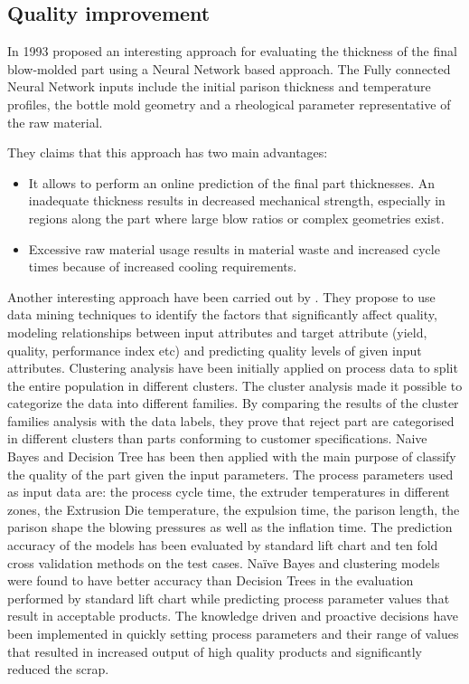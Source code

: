 \subsection{Quality improvement \label{Quality improvement}}

In 1993 \citep{diraddo1993line} proposed an interesting approach for evaluating the thickness of the final blow-molded part using a Neural Network based approach. The Fully connected Neural Network inputs include the initial parison thickness and temperature profiles, the bottle mold geometry and a rheological parameter representative of the raw material. 



They claims that this approach has two main advantages:

\begin{itemize}
    \item It allows to perform an online prediction of the final part thicknesses. An inadequate thickness results in decreased mechanical strength, especially in regions along the part where large blow ratios or complex geometries exist.
    \item Excessive raw material usage results in material waste and increased cycle times because of increased cooling requirements.
\end{itemize}

Another interesting approach have been carried out by \citep{ramana2013data}. They propose to use data mining techniques to identify the factors that significantly affect quality, modeling relationships between input attributes and target attribute (yield, quality, performance index etc) and predicting quality levels of given input attributes. Clustering analysis have been initially applied on process data to split the entire population in different clusters. The cluster analysis made it possible to categorize the data into different families. By comparing the results of the cluster families analysis with the data labels, they prove that reject part are categorised in different clusters than parts conforming to customer specifications. Naive Bayes and Decision Tree has been then applied with the main purpose of classify the quality of the part given the input parameters. The process parameters used as input data are: the process cycle time, the extruder temperatures in different zones, the Extrusion Die temperature, the expulsion time, the parison length, the parison shape the blowing pressures as well as the inflation time.
The prediction accuracy of the models has been evaluated by standard lift chart and ten fold cross validation methods on the test cases. Naïve Bayes and clustering models were found to have better accuracy than Decision Trees in the evaluation performed by standard lift chart while predicting process parameter values that result in acceptable products. The knowledge driven and proactive decisions have been implemented in quickly setting process parameters and their range of values that resulted in increased output of high quality products and significantly reduced the scrap.

